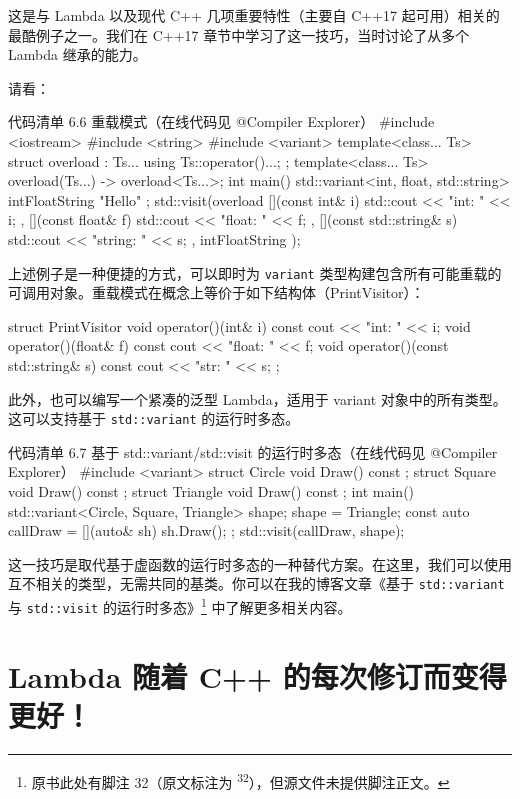 这是与 Lambda 以及现代 C++ 几项重要特性（主要自 C++17 起可用）相关的最酷例子之一。我们在 C++17 章节中学习了这一技巧，当时讨论了从多个 Lambda 继承的能力。

请看：

\begin{codeboxt}{代码清单 6.6 重载模式（在线代码见 @Compiler Explorer）}
#include <iostream>
#include <string>
#include <variant>
template<class... Ts> struct overload : Ts... { using Ts::operator()...; };
template<class... Ts> overload(Ts...) -> overload<Ts...>;
int main() {
std::variant<int, float, std::string> intFloatString { "Hello" };
std::visit(overload
{
[](const int& i) { std::cout << "int: " << i; },
[](const float& f) { std::cout << "float: " << f; },
[](const std::string& s) { std::cout << "string: " << s; }
},
intFloatString
);
}
\end{codeboxt}

上述例子是一种便捷的方式，可以即时为 \texttt{variant} 类型构建包含所有可能重载的可调用对象。重载模式在概念上等价于如下结构体（PrintVisitor）：

\begin{codebox}
struct PrintVisitor {
void operator()(int& i) const { cout << "int: " << i; }
void operator()(float& f) const { cout << "float: " << f; }
void operator()(const std::string& s) const { cout << "str: " << s; }
};
\end{codebox}

此外，也可以编写一个紧凑的泛型 Lambda，适用于 variant 对象中的所有类型。这可以支持基于 \texttt{std::variant} 的运行时多态。

\begin{codeboxt}{代码清单 6.7 基于 std::variant/std::visit 的运行时多态（在线代码见 @Compiler Explorer）}
#include <variant>
struct Circle { void Draw() const { } };
struct Square { void Draw() const { } };
struct Triangle { void Draw() const { } };
int main() {
std::variant<Circle, Square, Triangle> shape;
shape = Triangle{};
const auto callDraw = [](auto& sh) { sh.Draw(); };
std::visit(callDraw, shape);
}
\end{codeboxt}

这一技巧是取代基于虚函数的运行时多态的一种替代方案。在这里，我们可以使用互不相关的类型，无需共同的基类。你可以在我的博客文章《基于 \texttt{std::variant} 与 \texttt{std::visit} 的运行时多态》\footnote{原书此处有脚注 32（原文标注为 \textsuperscript{32}），但源文件未提供脚注正文。} 中了解更多相关内容。

\section{Lambda 随着 C++ 的每次修订而变得更好！}

